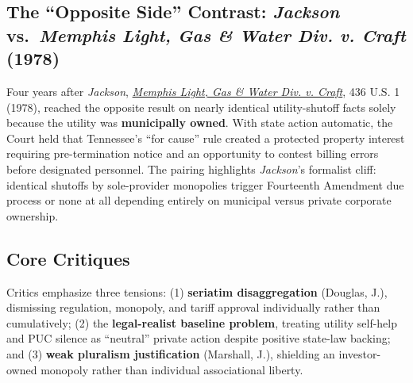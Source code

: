 \documentclass[12pt]{article}
\begin{document}
\subsection{The ``Opposite Side'' Contrast: \emph{Jackson} vs.\ \emph{Memphis Light, Gas \& Water Div. v. Craft} (1978)}
Four years after \emph{Jackson}, \href{https://supreme.justia.com/cases/federal/us/436/1/}{\emph{Memphis Light, Gas \& Water Div. v. Craft}}, 436 U.S. 1 (1978), reached the opposite result on nearly identical utility-shutoff facts solely because the utility was \textbf{municipally owned}. With state action automatic, the Court held that Tennessee's ``for cause'' rule created a protected property interest requiring pre-termination notice and an opportunity to contest billing errors before designated personnel. The pairing highlights \emph{Jackson}'s formalist cliff: identical shutoffs by sole-provider monopolies trigger Fourteenth Amendment due process or none at all depending entirely on municipal versus private corporate ownership.

\subsection{Core Critiques}
Critics emphasize three tensions: (1) \textbf{seriatim disaggregation} (Douglas, J.), dismissing regulation, monopoly, and tariff approval individually rather than cumulatively; (2) the \textbf{legal-realist baseline problem}, treating utility self-help and PUC silence as ``neutral'' private action despite positive state-law backing; and (3) \textbf{weak pluralism justification} (Marshall, J.), shielding an investor-owned monopoly rather than individual associational liberty.
\end{document}
